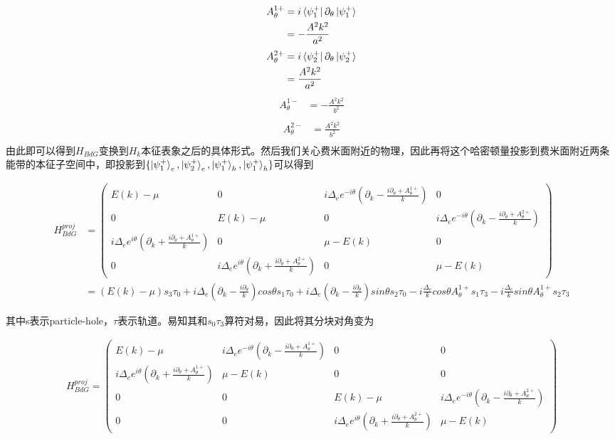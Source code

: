 \documentclass[22pt]{article}
\begin{document}
\begin{align}
	A_{\theta}^{1+}&=i\bra{\psi_1^+}\partial_{\theta}\ket{\psi_1^+}\\
	&=-\frac{A^2k^2}{a^2}
\end{align}
\begin{align}
	A_{\theta}^{2+}&=i\bra{\psi_2^+}\partial_{\theta}\ket{\psi_2^+}\\
					&=\frac{A^2k^2}{a^2}
\end{align}
\begin{align}
	A_{\theta}^{1-}&=-\frac{A^2k^2}{b^2} \\
\end{align}
\begin{align}
	A_{\theta}^{2-}&=\frac{A^2k^2}{b^2}\\
\end{align}
由此即可以得到$H_{BdG}$变换到$H_k$本征表象之后的具体形式。然后我们关心费米面附近的物理，因此再将这个哈密顿量投影到费米面附近两条能带的本征子空间中，即投影到$\{ \ket{\psi_{1}^{+}}_e,  \ket{\psi_{2}^{+}}_e,\ket{\psi_{1}^{+}}_h,\ket{\psi_{1}^{+}}_h \}$可以得到
\begin{normalsize}
\begin{align}
	H_{BdG}^{proj}&=
	\begin{pmatrix}
		E(k)-\mu   &0& i\Delta_ee^{-i\theta}(\partial_k-\frac{i\partial_{\theta}+A_{\theta}^{1+}}{k}) &0\\
		0&E(k)-\mu &0 &i\Delta_ee^{-i\theta}(\partial_k-\frac{i\partial_{\theta}+A_{\theta}^{2+}}{k}) \\
		i\Delta_ee^{i\theta}(\partial_k+\frac{i\partial_{\theta}+A_{\theta}^{1+}}{k})&0&\mu-E(k) &0 \\
		0&i\Delta_ee^{i\theta}(\partial_k+\frac{i\partial_{\theta}+A_{\theta}^{2+}}{k})&0& \mu-E(k)
	\end{pmatrix}\\
&=(E(k)-\mu)s_3\tau_0+i\Delta_e(\partial_k-\frac{i\partial_{\theta}}{k})cos\theta s_1\tau_0+i\Delta_e(\partial_k-\frac{i\partial_{\theta}}{k})sin\theta s_2\tau_0-i\frac{\Delta_e}{k}cos\theta A_{\theta}^{1+}s_1\tau_3-i\frac{\Delta_e}{k}sin\theta A_{\theta}^{1+}s_2\tau_3
\end{align}
\end{normalsize}
其中s表示particle-hole，$\tau$表示轨道。易知其和$s_0\tau_3$算符对易，因此将其分块对角变为
\begin{normalsize}
\begin{align}
	H_{BdG}^{proj}=
	\begin{pmatrix}
		E(k)-\mu    &i\Delta_ee^{-i\theta}(\partial_k-\frac{i\partial_{\theta}+A_{\theta}^{1+}}{k})&0&0\\
		i\Delta_ee^{i\theta}(\partial_k+\frac{i\partial_{\theta}+A_{\theta}^{1+}}{k})& \mu-E(k) &0&0\\
		0&0&E(k)-\mu & i\Delta_ee^{-i\theta}(\partial_k-\frac{i\partial_{\theta}+A_{\theta}^{2+}}{k}) \\
		0&0&i\Delta_ee^{i\theta}(\partial_k+\frac{i\partial_{\theta}+A_{\theta}^{2+}}{k})& \mu-E(k)
	\end{pmatrix}
\end{align}
\end{normalsize}
\end{document}
